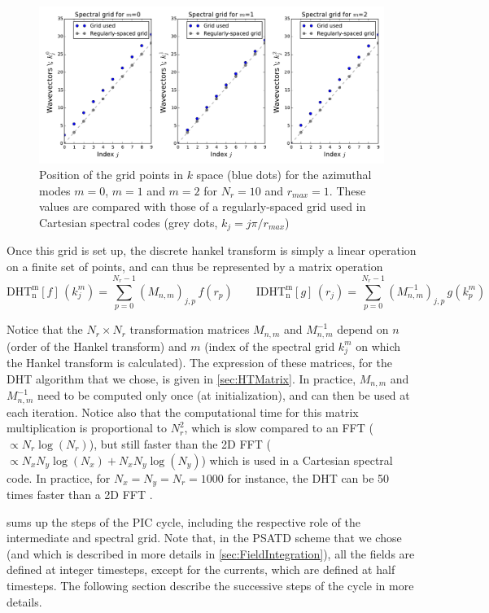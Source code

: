 \documentclass[a4paper]{article}   	%
\begin{document}
\begin{figure}[!h]
\includegraphics[width=\textwidth]{KGrid.pdf}
\caption{\label{fig:Kgrid}Position of the grid points in $k$ space
  (blue dots) for the azimuthal modes $m=0$, $m=1$ and $m=2$ for $N_r
  = 10$ and $r_{max}=1$. These values are compared with those of a
  regularly-spaced grid used in Cartesian spectral codes (grey dots, $k_j = j\pi/r_{max}$)}
\end{figure}

Once this grid is set up, the discrete hankel transform is simply a
linear operation on a finite set of points, and can thus be
represented by a matrix operation
\[ \mathrm{DHT^m_n}[f] \,(k^m_j) = \sum_{p=0}^{N_r-1} (M_{n,m})_{j,p}
\,f(r_p) \qquad \mathrm{IDHT^m_n}[g] \, (r_j) = \sum_{p=0}^{N_r-1}
(M^{-1}_{n,m})_{j,p} \,g(k^m_p) \]

Notice that the $N_r\times N_r$ transformation matrices $M_{n,m}$ and
$M_{n,m}^{-1}$ depend on $n$ (order of the Hankel transform) and $m$
(index of the spectral grid $k^m_j$ on which the Hankel transform is calculated). The expression of these matrices,
for the DHT algorithm that we chose, is given in
\cref{sec:HTMatrix}. %
In practice, $M_{n,m}$ and $M^{-1}_{n,m}$ need to be
computed only once (at initialization), and can then be used at each
iteration. Notice also that the computational time for this
matrix multiplication is proportional to $N_r^2$, which is slow
compared to an FFT ($\propto N_r \log(N_r)$), but
still faster than the 2D FFT ($\propto N_x N_y \log(N_x) + N_x N_y \log(N_y) $)
which is used in a Cartesian spectral code. In practice, for $N_x = N_y =
N_r = 1000$ for instance, the DHT can be 50 times faster than a 2D FFT \cite{Norfolk}.

 sums up the steps of the PIC cycle, including the
respective role of the intermediate and spectral grid. Note that, in the PSATD
scheme that we chose (and which is described in more details in
\cref{sec:FieldIntegration}), all the fields are defined at integer
timesteps, except for the currents, which are defined at half
timesteps. The following section describe the successive steps of the cycle in more details.
\end{document}
